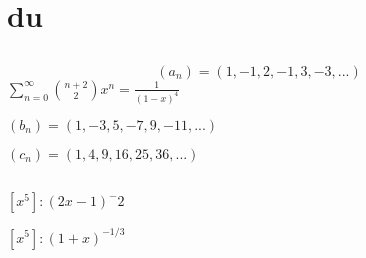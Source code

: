 \documentclass[a4paper]{article}
\begin{document}
\section{du}
\subsection{}

$$
(a_n) = (1, -1, 2, -1, 3, -3, ...)
$$
$
\sum_{n=0}^{\infty}\binom{n+2}{2}x^n = \frac{1}{(1-x)^4}
$


$
(b_n) = (1, -3, 5, -7, 9, -11, ...)
$



$
(c_n) = (1, 4, 9, 16, 25, 36, ...)
$

\subsection{}
$
[x^5] : (2x - 1)^-2
$

$
[x^5] : (1 + x)^{-1/3}
$


\subsection{}
\end{document}

